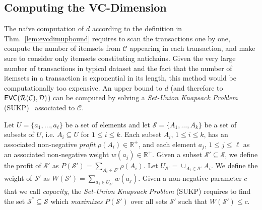 \subsection{Computing the VC-Dimension}\label{sec:computvc}
The na\"ive computation of $d$  according to the definition in Thm.~\ref{lem:evcdimupbound}
requires to scan the transactions one by one,
compute the number of itemsets from $\mathcal{C}$ appearing in each
transaction, and make sure to consider only itemsets constituting antichains. Given the very large
number of transactions in typical dataset and the fact that the number of
itemsets in a transaction is exponential in its length, this method would be
computationally too expensive. An upper bound to $d$ (and therefore to
$\mathsf{EVC}(\mathcal{R}(\mathcal{C}),{\cal D})$) can be computed by solving a
\emph{Set-Union Knapsack Problem} (SUKP)~\citep{GoldschmidtNY94} associated to
$\mathcal{C}$.

\begin{definition}\label{def:sukp}
  Let $U=\{a_1,\dotsc,a_\ell\}$ be a set of elements and let
  $\mathcal{S}=\{A_1,\dotsc,A_k\}$ be a set of subsets of $U$, i.e.
  $A_i\subseteq U$ for $1\le i\le k$. Each subset $A_i$, $1\le i\le k$, has an associated
  non-negative \emph{profit} $\rho(A_i)\in\mathbb{R}^+$, and each element $a_j$, $1\le
  j\le\ell$ as an associated non-negative weight $w(a_j)\in\mathbb{R}^+$.
  Given a subset $\mathcal{S}'\subseteq\mathcal{S}$, we define the profit of
  $\mathcal{S}'$ as $P(\mathcal{S}')=\sum_{A_i\in \mathcal{S}'}\rho(A_i)$. Let
  $U_{\mathcal{S}'}=\cup_{A_i\in\mathcal{S}'} A_i$. We
  define the weight of $\mathcal{S}'$ as $W(\mathcal{S}')=\sum_{a_j\in
  U_{\mathcal{S}'}} w(a_j)$. Given a non-negative parameter $c$ that we call
  \emph{capacity}, the \emph{Set-Union Knapsack Problem} (SUKP) requires to find
  the set $\mathcal{S}^*\subseteq\mathcal{S}$ which \emph{maximizes}
  $P(\mathcal{S}')$ over all sets $\mathcal{S}'$ such that $W(\mathcal{S}')\le c$.
\end{definition}

